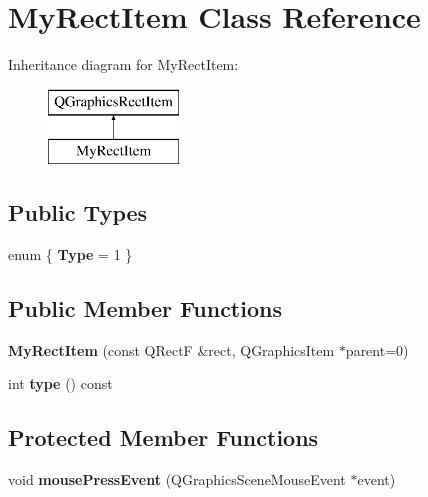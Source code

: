\hypertarget{class_my_rect_item}{}\section{My\+Rect\+Item Class Reference}
\label{class_my_rect_item}
Inheritance diagram for My\+Rect\+Item\+:\begin{figure}[H]
\begin{center}
\leavevmode
\includegraphics[height=2.000000cm]{class_my_rect_item}
\end{center}
\end{figure}
\subsection*{Public Types}
\begin{DoxyCompactItemize}
\item 
\hypertarget{class_my_rect_item_a7c879c8fc50d7da6e36405d8a55688e1}{}enum \{ {\bfseries Type} = 1
 \}\label{class_my_rect_item_a7c879c8fc50d7da6e36405d8a55688e1}

\end{DoxyCompactItemize}
\subsection*{Public Member Functions}
\begin{DoxyCompactItemize}
\item 
\hypertarget{class_my_rect_item_adb1987c24d2977cde750e98c9f34b801}{}{\bfseries My\+Rect\+Item} (const Q\+Rect\+F \&rect, Q\+Graphics\+Item $\ast$parent=0)\label{class_my_rect_item_adb1987c24d2977cde750e98c9f34b801}

\item 
\hypertarget{class_my_rect_item_a5392f7adb9afeb5fb1de90424b1d25ed}{}int {\bfseries type} () const \label{class_my_rect_item_a5392f7adb9afeb5fb1de90424b1d25ed}

\end{DoxyCompactItemize}
\subsection*{Protected Member Functions}
\begin{DoxyCompactItemize}
\item 
\hypertarget{class_my_rect_item_a6fe4b88e45e42f693e101bd35372721f}{}void {\bfseries mouse\+Press\+Event} (Q\+Graphics\+Scene\+Mouse\+Event $\ast$event)\label{class_my_rect_item_a6fe4b88e45e42f693e101bd35372721f}

\end{DoxyCompactItemize}

